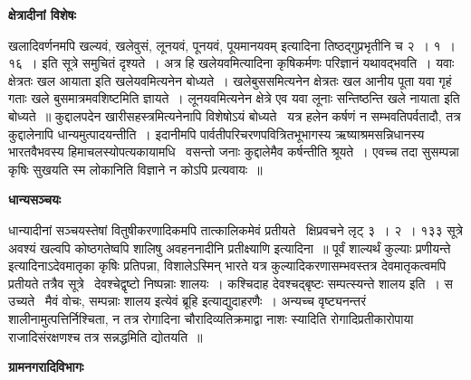 \documentclass[11pt, openany]{book}
\begin{document}
\begin{center}
\textbf{\Large क्षेत्रादीनां विशेषः \textendash\ }
\end{center}

खलादिवर्णनमपि {\qt खल्यवं, खलेवुसं, लूनयवं, पूनयवं, पूयमानयवम्} इत्यादिना तिष्ठद्गुप्रभृतीनि च २~। १~। १६~। इति सूत्रे समुचितं दृश्यते~। अत्र हि खलेयवमित्यादिना कृषिकर्मणः परिज्ञानं यथावद्भवति~। यवाः क्षेत्रतः खल आयाता इति खलेयवमित्यनेन बोध्यते~। खलेबुससमित्यनेन क्षेत्रतः खल आनीय पूता यवा गृहं गताः खले बुसमात्रमवशिष्टमिति ज्ञायते~। लूनयवमित्यनेन क्षेत्रे एव यवा लूनाः सन्तिष्ठन्ति खले नायाता इति बोध्यते~॥ कुद्दालपदेन खारीसहस्त्रमित्यनेनापि विशेषोऽयं बोध्यते \textendash\ यत्र हलेन कर्षणं न सम्भवतिपर्वतादौ, तत्र कुद्दालेनापि धान्यमुत्पादयन्तीति~। इदानीमपि पार्वतीपरिचरणपवित्रितभूभागस्य ऋष्याश्रमसन्निधानस्य भारतवैभवस्य हिमाचलस्योपत्यकायामधि \textendash\ वसन्तो जनाः कुद्दालेमैव कर्षन्तीति श्रूयते~। एवच्च तदा सुसम्पन्ना कृषिः सुखयति स्म लोकानिति विज्ञाने न कोऽपि प्रत्यवायः~॥

\begin{center}
\textbf{\Large धान्यसञ्चयः \textendash\ }
\end{center}

धान्यादीनां सञ्चयस्तेषां वितुषीकरणादिकमपि तात्कालिकमेवं प्रतीयते \textendash\ क्षिप्रवचने लृट् ३~। २~। १३३ सूत्रे {\qt अवश्यं खल्वपि कोष्ठगतेष्वपि शालिषु अवहननादीनि प्रतीक्ष्याणि} इत्यादिना~॥ पूर्वं {\qt शाल्यर्थं कुल्याः प्रणीयन्ते} इत्यादिनाऽदेवमातृका कृषिः प्रतिपन्ना, विशालेऽस्मिन् भारते यत्र कुल्यादिकरणासम्भवस्तत्र देवमातृकत्वमपि प्रतीयते तत्रैव सूत्रे \textendash\ {\qt देवश्चेद्वृष्टो निष्पन्नाः शालयः}~। कश्चिदाह देवश्चद्बृष्टः सम्पत्स्यन्ते शालय इति~। स उच्यते \textendash\ मैवं वोचः, सम्पन्नाः शालय इत्येवं ब्रूहि इत्याद्युदाहरणैः~। अन्यच्च वृष्ट्यनन्तरं शालीनामुत्पत्तिर्निश्चिता, न तत्र रोगादिना चौरादिव्यतिक्रमाद्वा नाशः स्यादिति रोगादिप्रतीकारोपाया राजादिसंरक्षणश्च तत्र सन्नद्धमिति द्योतयति~॥ \textendash\ 

\begin{center}
\textbf{\Large ग्रामनगरादिविभागः \textendash\ }
\end{center}
\end{document}
